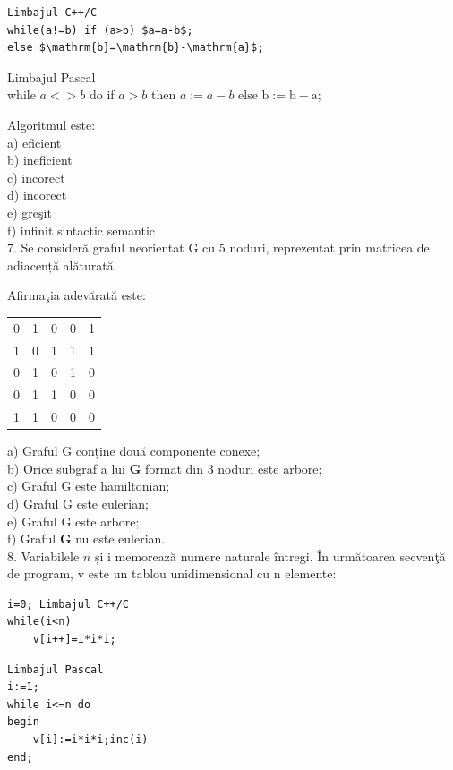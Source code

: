 \documentclass[10pt]{article}
\begin{document}
\begin{verbatim}
Limbajul C++/C
while(a!=b) if (a>b) $a=a-b$;
else $\mathrm{b}=\mathrm{b}-\mathrm{a}$;
\end{verbatim}

Limbajul Pascal\\
while $a<>b$ do if $a>b$ then $a:=a-b$ else $\mathrm{b}:=\mathrm{b}-\mathrm{a}$;

Algoritmul este:\\
a) eficient\\
b) ineficient\\
c) incorect\\
d) incorect\\
e) greşit\\
f) infinit sintactic semantic\\
7. Se consideră graful neorientat G cu 5 noduri, reprezentat prin matricea de adiacență alăturată.

Afirmaţia adevărată este:

\begin{center}
\begin{tabular}{lllll}
0 & 1 & 0 & 0 & 1 \\
1 & 0 & 1 & 1 & 1 \\
0 & 1 & 0 & 1 & 0 \\
0 & 1 & 1 & 0 & 0 \\
1 & 1 & 0 & 0 & 0 \\
\end{tabular}
\end{center}

a) Graful G conține două componente conexe;\\
b) Orice subgraf a lui $\mathbf{G}$ format din 3 noduri este arbore;\\
c) Graful G este hamiltonian;\\
d) Graful G este eulerian;\\
e) Graful G este arbore;\\
f) Graful $\mathbf{G}$ nu este eulerian.\\
8. Variabilele $n$ și i memorează numere naturale întregi. În următoarea secvenţă de program, v este un tablou unidimensional cu n elemente:

\begin{verbatim}
i=0; Limbajul C++/C
while(i<n)
    v[i++]=i*i*i;
\end{verbatim}

\begin{verbatim}
Limbajul Pascal
i:=1;
while i<=n do
begin
    v[i]:=i*i*i;inc(i)
end;
\end{verbatim}
\end{document}

